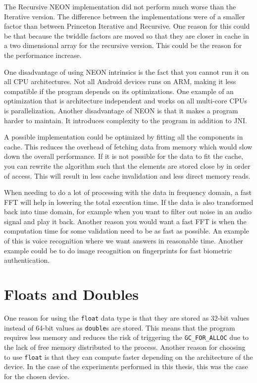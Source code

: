 The Recursive NEON implementation did not perform much worse than the Iterative version. The difference between the implementations were of a smaller factor than between Princeton Iterative and Recursive. One reason for this could be that because the twiddle factors are moved so that they are closer in cache in a two dimensional array for the recursive version. This could be the reason for the performance increase.


One disadvantage of using NEON intrinsics is the fact that you cannot run it on all CPU architectures. Not all Android devices runs on ARM, making it less compatible if the program depends on its optimizations. One example of an optimization that is architecture independent and works on all multi-core CPUs is parallelization. Another disadvantage of NEON is that it makes a program harder to maintain. It introduces complexity to the program in addition to JNI. 

A possible implementation could be optimized by fitting all the components in cache. This reduces the overhead of fetching data from memory which would slow down the overall performance. If it is not possible for the data to fit the cache, you can rewrite the algorithm such that the elements are stored close by in order of access. This will result in less cache invalidation and less direct memory reads.

When needing to do a lot of processing with the data in frequency domain, a fast FFT will help in lowering the total execution time. If the data is also transformed back into time domain, for example when you want to filter out noise in an audio signal and play it back. Another reason you would want a fast FFT is when the computation time for some validation need to be as fast as possible. An example of this is voice recognition where we want answers in reasonable time. Another example could be to do image recognition on fingerprints for fast biometric authentication.



\section{Floats and Doubles}

One reason for using the \texttt{float} data type is that they are stored as 32-bit values instead of 64-bit values as \texttt{double}s are stored. This means that the program requires less memory and reduces the risk of triggering the \texttt{GC\_FOR\_ALLOC} due to the lack of free memory distributed to the process. Another reason for choosing to use \texttt{float} is that they can compute faster depending on the architecture of the device. In the case of the experiments performed in this thesis, this was the case for the chosen device.

